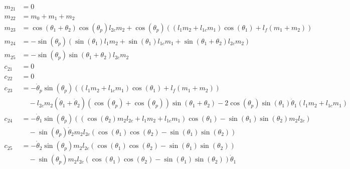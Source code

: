 \documentclass{article}
\begin{document}
\begin{equation}
	\begin{aligned}
		m_{21} & = 0 \\
		m_{22} & = m_0 + m_1 + m_2 \\
		m_{23} & = \cos(\theta_1 + \theta_2) \cos(\theta_p) l_{2c} m_2 + \cos(\theta_p) ((l_1 m_2 + l_{1c} m_1) \cos(\theta_1) + l_f (m_1 + m_2)) \\
		m_{24} & = -\sin(\theta_p) (\sin(\theta_1) l_1 m_2 + \sin(\theta_1) l_{1c} m_1 + \sin(\theta_1 + \theta_2) l_{2c} m_2) \\
		m_{25} & = -\sin(\theta_p) \sin(\theta_1 + \theta_2) l_{2c} m_2 \\
		c_{21} & = 0 \\
		c_{22} & = 0 \\
		c_{23} & = - \dot \theta_p \sin(\theta_p) ((l_1 m_2 + l_{1c} m_1) \cos(\theta_1) + l_f (m_1 + m_2)) \\
		&\quad -l_{2c} m_2 (\dot \theta_1 + \dot \theta_2) (\cos(\theta_p) + \cos(\theta_p)) \sin(\theta_1 + \theta_2) - 2 \cos(\theta_p) \sin(\theta_1) \dot \theta_1 (l_1 m_2 + l_{1c} m_1)\\
		c_{24} & = - \dot \theta_1 \sin(\theta_p) ((\cos(\theta_2) m_2 l_{2c} + l_1 m_2 + l_{1c} m_1) \cos(\theta_1) - \sin(\theta_1) \sin(\theta_2) m_2 l_{2c}) \\
		&\quad - \sin(\theta_p) \dot \theta_2 m_2 l_{2c} (\cos(\theta_1) \cos(\theta_2) - \sin(\theta_1) \sin(\theta_2))\\
		c_{25} & = - \dot \theta_2 \sin(\theta_p) m_2 l_{2c} (\cos(\theta_1) \cos(\theta_2) - \sin(\theta_1) \sin(\theta_2)) \\
		&\quad - \sin(\theta_p) m_2 l_{2c} (\cos(\theta_1) \cos(\theta_2) - \sin(\theta_1) \sin(\theta_2)) \dot \theta_1\\
	\end{aligned}
\end{equation}
\end{document}
